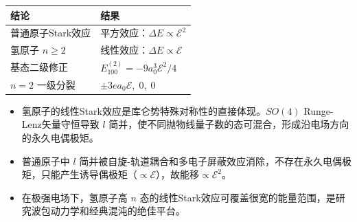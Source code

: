 \begin{formulabox}[答案汇总]
\begin{center}
\begin{tabular}{ll}
\toprule
\textbf{结论} & \textbf{结果} \\
\midrule
普通原子Stark效应 & 平方效应：$\Delta E\propto\mathcal{E}^2$ \\
氢原子 $n\ge2$ & 线性效应：$\Delta E\propto\mathcal{E}$ \\
基态二级修正 & $E_{100}^{(2)}=-9a_0^3\mathcal{E}^2/4$ \\
$n=2$ 一级分裂 & $\pm3ea_0\mathcal{E},\;0,\;0$ \\
\bottomrule
\end{tabular}
\end{center}
\end{formulabox}

\begin{insightbox}[物理图像]
\begin{itemize}
    \item 氢原子的线性Stark效应是库仑势特殊对称性的直接体现。$SO(4)$ Runge-Lenz矢量守恒导致 $l$ 简并，使不同抛物线量子数的态可混合，形成沿电场方向的永久电偶极矩。
    \item 普通原子中 $l$ 简并被自旋-轨道耦合和多电子屏蔽效应消除，不存在永久电偶极矩，只能产生诱导偶极矩（$\propto\mathcal{E}$），故能移$\propto\mathcal{E}^2$。
    \item 在极强电场下，氢原子高 $n$ 态的线性Stark效应可覆盖很宽的能量范围，是研究波包动力学和经典混沌的绝佳平台。
\end{itemize}
\end{insightbox}
